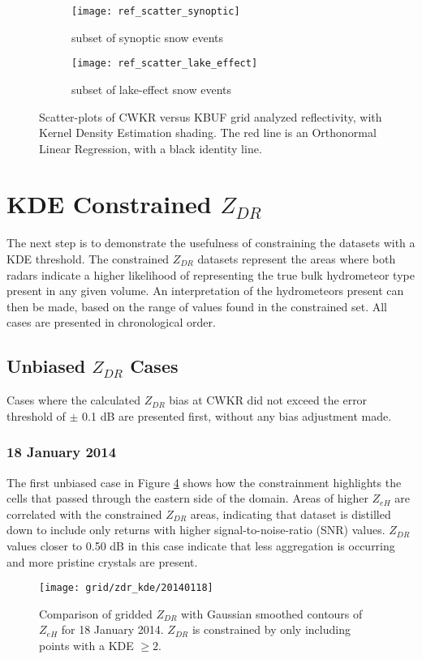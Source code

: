 \begin{figure}[H]
\centering
   \begin{subfigure}{0.49\linewidth} \centering
     \texttt{[image: ref\_scatter\_synoptic]}
     \caption{subset of synoptic snow events}\label{fig:ref_synoptic}
   \end{subfigure}
   \begin{subfigure}{0.49\linewidth} \centering
     \texttt{[image: ref\_scatter\_lake\_effect]}
     \caption{subset of lake-effect snow events}\label{fig:ref_lake_effect}
   \end{subfigure}
\caption{Scatter-plots of CWKR versus KBUF grid analyzed reflectivity, with Kernel Density Estimation shading. The red line is an Orthonormal Linear
Regression, with a black identity line.} \label{fig:ref_scatter}
\end{figure}

\section{KDE Constrained $Z_{DR}$}
The next step is to demonstrate the usefulness of constraining the datasets with a KDE threshold. The
constrained $Z_{DR}$ datasets represent the areas where both radars indicate a higher likelihood of
representing the true bulk hydrometeor type present in any given volume. An interpretation of the
hydrometeors present can then be made, based on the range of values found in the constrained set. All
cases are presented in chronological order.
\subsection{Unbiased $Z_{DR}$ Cases}
Cases where the calculated $Z_{DR}$ bias at CWKR did not exceed the error threshold of $\pm$ 0.1 dB are presented first, without any bias adjustment made.
\subsubsection{18 January 2014}
The first unbiased case in Figure \ref{fig:grid_zdr_kde_20140118} shows how the constrainment highlights the cells that passed through the eastern side of the domain. Areas of higher $Z_{eH}$  are correlated with the constrained $Z_{DR}$ areas, indicating that dataset is distilled down to include only returns with higher signal-to-noise-ratio (SNR) values. $Z_{DR}$ values closer to 0.50 dB in this case indicate that less aggregation is occurring and more pristine crystals are present.
\begin{figure}[H]
\texttt{[image: grid/zdr\_kde/20140118]}
\caption{Comparison of gridded $Z_{DR}$ with Gaussian smoothed contours of $Z_{eH}$ for 18 January 2014. $Z_{DR}$ is constrained by only including points with a
KDE $\geq 2$.}
\label{fig:grid_zdr_kde_20140118}
\end{figure}
